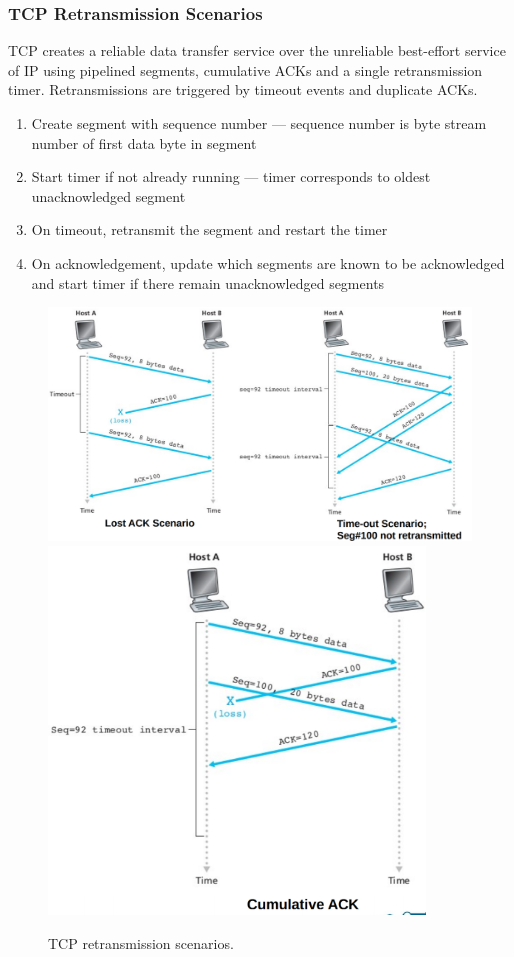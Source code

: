 \subsubsection{TCP Retransmission Scenarios}

TCP creates a reliable data transfer service over the unreliable best-effort service of IP using pipelined segments, cumulative ACKs and a single retransmission timer.
Retransmissions are triggered by timeout events and duplicate ACKs.

\begin{enumerate}
  \item Create segment with sequence number --- sequence number is byte stream number of first data byte in segment
  \item Start timer if not already running --- timer corresponds to oldest unacknowledged segment
  \item On timeout, retransmit the segment and restart the timer
  \item On acknowledgement, update which segments are known to be acknowledged and start timer if there remain unacknowledged segments
\end{enumerate}

\begin{figure}[htp]
  \centering
  \includegraphics[width=15cm]{unit-18/figures/retransmission-scenarios-1.png}
  \includegraphics[width=10cm]{unit-18/figures/retransmission-scenarios-2.png}
  \caption*{TCP retransmission scenarios.}
\end{figure}

